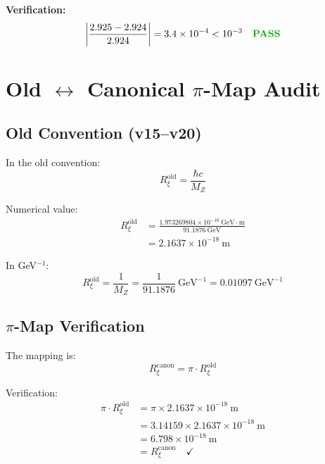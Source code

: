 \documentclass[11pt,a4paper]{article}
\newcommand{\Rxi}{R_\xi}
\newcommand{\MZ}{M_Z}
\newcommand{\hbarc}{\hbar c}
\newcommand{\PASS}{\textcolor{green!70!black}{\textbf{PASS}}}
\begin{document}
\textbf{Verification:}
\begin{equation}
\left| \frac{2.925 - 2.924}{2.924} \right| = 3.4 \times 10^{-4} < 10^{-3} \quad \PASS
\label{eq:Planck-map-verify}
\end{equation}

\section{Old $\leftrightarrow$ Canonical $\pi$-Map Audit}

\subsection{Old Convention (v15--v20)}

In the old convention:
\begin{equation}
\Rxi^{\mathrm{old}} = \frac{\hbarc}{\MZ}
\label{eq:Rxi-old-formula}
\end{equation}

Numerical value:
\begin{align}
\Rxi^{\mathrm{old}} &= \frac{1.973269804 \times 10^{-16}~\mathrm{GeV \cdot m}}{91.1876~\mathrm{GeV}}
\label{eq:Rxi-old-step1}\\
&= 2.1637 \times 10^{-18}~\mathrm{m} \label{eq:Rxi-old-result}
\end{align}

In GeV$^{-1}$:
\begin{equation}
\Rxi^{\mathrm{old}} = \frac{1}{\MZ} = \frac{1}{91.1876}~\mathrm{GeV}^{-1} = 0.01097~\mathrm{GeV}^{-1}
\label{eq:Rxi-old-GeV}
\end{equation}

\subsection{$\pi$-Map Verification}

The mapping is:
\begin{equation}
\Rxi^{\mathrm{canon}} = \pi \cdot \Rxi^{\mathrm{old}}
\label{eq:pi-map-Rxi}
\end{equation}

Verification:
\begin{align}
\pi \cdot \Rxi^{\mathrm{old}} &= \pi \times 2.1637 \times 10^{-18}~\mathrm{m}
\label{eq:pi-map-step1}\\
&= 3.14159 \times 2.1637 \times 10^{-18}~\mathrm{m} \label{eq:pi-map-step2}\\
&= 6.798 \times 10^{-18}~\mathrm{m} \label{eq:pi-map-step3}\\
&= \Rxi^{\mathrm{canon}} \quad \checkmark \label{eq:pi-map-check}
\end{align}
\end{document}
